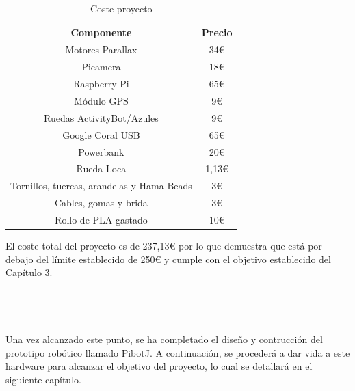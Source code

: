\begin{table}[H]
	\begin{center}
		\begin{tabular}{|c|c|}
			\hline
			Componente & Precio \\
			\hline
			Motores Parallax & 34€ \\
			\hline
			Picamera &  18€ \\
			\hline
			Raspberry Pi & 65€ \\
			\hline
			Módulo GPS & 9€ \\
			\hline
			Ruedas ActivityBot/Azules & 9€ \\
			\hline
			Google Coral USB & 65€ \\
			\hline
			Powerbank & 20€ \\
			\hline
			Rueda Loca & 1,13€ \\
			\hline
			Tornillos, tuercas, arandelas y Hama Beads & 3€ \\
			\hline
			Cables, gomas y brida & 3€ \\
			\hline
			Rollo de PLA gastado & 10€ \\
			\hline
		\end{tabular}
		\caption{Coste proyecto}
		\label{cuadro:costetotal}
	\end{center}
\end{table}

El coste total del proyecto es de 237,13€ por lo que demuestra que está por debajo del límite establecido de 250€ y cumple con el objetivo establecido del Capítulo 3.\\\\\\\\\\


Una vez alcanzado este punto, se ha completado el diseño y contrucción del prototipo robótico llamado PibotJ. A continuación, se procederá a dar vida a este hardware para alcanzar el objetivo del proyecto, lo cual se detallará en el siguiente capítulo.

